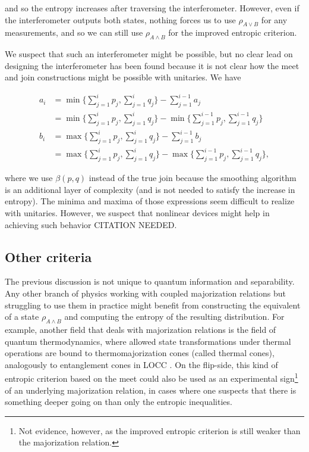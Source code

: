 \noindent and so the entropy increases after traversing the interferometer. However, even if the interferometer outputs both states, nothing forces us to use $\rho_{A \vee B}$ for any measurements, and so we can still use $\rho_{A \wedge B}$ for the improved entropic criterion.

We suspect that such an interferometer might be possible, but no clear lead on designing the interferometer has been found because it is not clear how the meet and join constructions might be possible with unitaries. We have

\begin{align}
    a_i &= \min \Big\{ \sum_{j=1}^{i} p_j , \sum_{j=1}^{i} q_j \Big\} - \sum_{j=1}^{i-1} a_j\\
    &= \min \Big\{ \sum_{j=1}^{i} p_j , \sum_{j=1}^{i} q_j \Big\} - \min \Big\{ \sum_{j=1}^{i-1} p_j , \sum_{j=1}^{i-1} q_j \Big\}\\
    b_i &= \max \Big\{ \sum_{j=1}^{i} p_j , \sum_{j=1}^{i} q_j \Big\} - \sum_{j=1}^{i-1} b_j\\
    &= \max \Big\{ \sum_{j=1}^{i} p_j , \sum_{j=1}^{i} q_j \Big\} - \max \Big\{ \sum_{j=1}^{i-1} p_j , \sum_{j=1}^{i-1} q_j \Big\},
\end{align}

\noindent where we use $\beta(p, q)$ instead of the true join because the smoothing algorithm is an additional layer of complexity (and is not needed to satisfy the increase in entropy). The minima and maxima of those expressions seem difficult to realize with unitaries. However, we suspect that nonlinear devices might help in achieving such behavior CITATION NEEDED.


\subsection{Other criteria}

The previous discussion is not unique to quantum information and separability. Any other branch of physics working with coupled majorization relations but struggling to use them in practice might benefit from constructing the equivalent of a state $\rho_{A \wedge B}$ and computing the entropy of the resulting distribution. For example, another field that deals with majorization relations is the field of quantum thermodynamics, where allowed state transformations under thermal operations are bound to thermomajorization cones (called thermal cones), analogously to entanglement cones in LOCC \cite{junior_geometric_2022, korzekwa_structure_2017}. On the flip-side, this kind of entropic criterion based on the meet could also be used as an experimental sign\footnote{Not evidence, however, as the improved entropic criterion is still weaker than the majorization relation.} of an underlying majorization relation, in cases where one suspects that there is something deeper going on than only the entropic inequalities.



